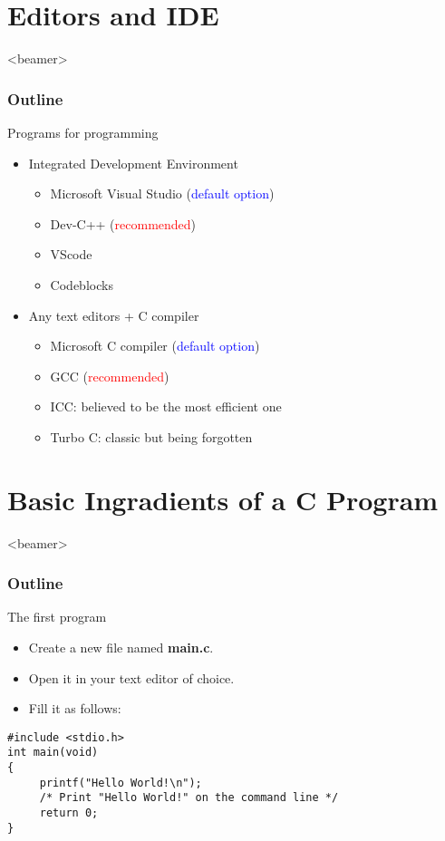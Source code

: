 \section{Editors and IDE}
\begin{frame}<beamer>
    \frametitle{Outline}
    \tableofcontents[currentsection]
\end{frame}

\begin{frame}{Programs for programming}
	\begin{itemize}
		\item {Integrated Development Environment}
		\begin{itemize}
			\item {Microsoft Visual Studio (\textcolor{blue}{default option})}
			\item {Dev-C++ (\textcolor{red}{recommended})}
			\item {VScode}
			\item {Codeblocks}
		\end{itemize}
		\item {Any text editors + C compiler}
		\begin{itemize}
			\item {Microsoft C compiler (\textcolor{blue}{default option})}
			\item {GCC (\textcolor{red}{recommended})}
			\item {ICC: believed to be the most efficient one}
			\item {Turbo C: classic but being forgotten}
		\end{itemize}	
		\end{itemize}
\end{frame}

\section{Basic Ingradients of a C Program}
\label{sec:inter}
\begin{frame}<beamer>
    \frametitle{Outline}
    \tableofcontents[currentsection]
\end{frame}

\begin{frame}[fragile]{The first program}
	\begin{itemize}
		\item Create a new file named \textbf{main.c}.
		\item Open it in your text editor of choice.
		\item Fill it as follows:
	\end{itemize}
	\begin{lstlisting}[frame=non]
#include <stdio.h>
int main(void)
{
     printf("Hello World!\n");
     /* Print "Hello World!" on the command line */
     return 0;
}
	\end{lstlisting}
\end{frame}


